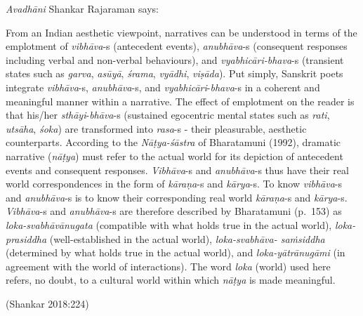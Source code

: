 \textsl{Avadhāni} Shankar Rajaraman says:

\begin{myquote}
From an Indian aesthetic viewpoint, narratives can be understood in terms of the emplotment of \textsl{vibhāva}-s (antecedent events), \textsl{anubhāva}-s (consequent responses including verbal and non-verbal behaviours), and \textsl{vyabhicāri-bhava}-s (transient states such as \textsl{garva}, \textsl{asūyā}, \textsl{śrama}, \textsl{vyādhi}, \textsl{viṣāda}). Put simply, Sanskrit poets integrate \textsl{vibhāva}-s, \textsl{anubhāva}-s, and \textsl{vyabhicāri}-\textsl{bhava}-s in a coherent and meaningful manner within a narrative. The effect of emplotment on the reader is that his/her \textsl{sthāyi}-\textsl{bhāva}-s (sustained egocentric mental states such as \textsl{rati}, \textsl{utsāha}, \textsl{śoka}) are transformed into \textsl{rasa}-s - their pleasurable, aesthetic counterparts. According to the \textsl{Nāṭya-śāstra} of Bharatamuni (1992), dramatic narrative (\textsl{nāṭya}) must refer to the actual world for its depiction of antecedent events and consequent responses. \textsl{Vibhāva}-s and \textsl{anubhāva}-s thus have their real world correspondences in the form of \textsl{kāraṇa}-s and \textsl{kārya}-s. To know \textsl{vibhāva}-s and \textsl{anubhāva}-s is to know their corresponding real world \textsl{kāraṇa}-s and \textsl{kārya}-s. \textsl{Vibhāva}-s and \textsl{anubhāva}-s are therefore described by Bharatamuni (p.~153) as \textsl{loka-svabhāvānugata} (compatible with what holds true in the actual world), \textsl{loka-prasiddha} (well-established in the actual world), \textsl{loka-svabhāva- saṁsiddha} (determined by what holds true in the actual world), and \textsl{loka-yātrānugāmi} (in agreement with the world of interactions). The word \textsl{loka} (world) used here refers, no doubt, to a cultural world within which \textsl{nāṭya} is made meaningful. 

\hfill(Shankar 2018:224)
\end{myquote}

